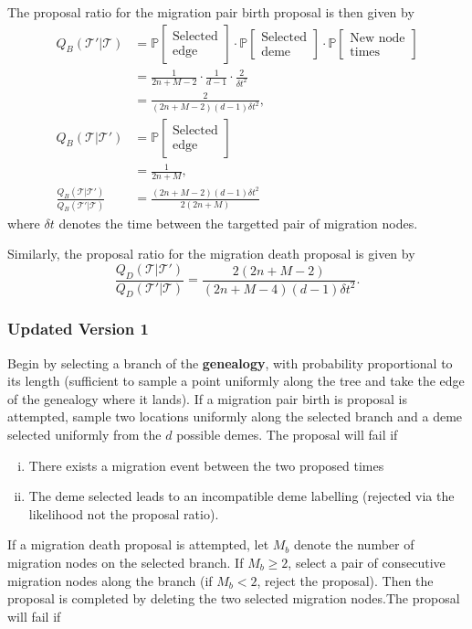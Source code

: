 \documentclass[12pt,a4paper]{article}
\newcommand{\calT}{\mathcal{T}}
\newcommand{\bbP}{\mathbb{P}}
\begin{document}
				The proposal ratio for the migration pair birth proposal is then given by
					\begin{align*}
						Q_B(\calT' | \calT) & = \bbP [\substack{\text{Selected} \\ \text{edge}}] \cdot \bbP [\substack{\text{Selected} \\ \text{deme}}] \cdot \bbP [\substack{\text{New node} \\ \text{times}}] \\
							& = \frac{1}{2n + M - 2} \cdot \frac{1}{d-1} \cdot \frac{2}{\delta t^2} \\
							& = \frac{2}{(2n + M - 2) (d-1) \delta t^2}, \\
						Q_B (\calT | \calT') & = \bbP [ \substack{\text{Selected} \\ \text{edge}}] \\
							& = \frac{1}{2n + M}, \\
						\frac{Q_B (\calT | \calT')}{Q_B (\calT' | \calT)} & = \frac{(2n + M - 2) (d-1) \delta t^2}{2(2n + M)}
					\end{align*}
				where $\delta t$ denotes the time between the targetted pair of migration nodes.
				
				Similarly, the proposal ratio for the migration death proposal is given by
					\[
						\frac{Q_D( \calT | \calT')}{Q_D (\calT' | \calT)} = \frac{2 (2n+M-2)}{(2n + M - 4) (d-1) \delta t^2}.
					\]
					
			\subsubsection{Updated Version 1}
				Begin by selecting a branch of the \textbf{genealogy}, with probability proportional to its length (sufficient to sample a point uniformly along the tree and take the edge of the genealogy where it lands). If a migration pair birth is proposal is attempted, sample two locations uniformly along the selected branch and a deme selected uniformly from the $d$ possible demes. The proposal will fail if
				
					\begin{enumerate}[(i)]
						\item There exists a migration event between the two proposed times
						\item The deme selected leads to an incompatible deme labelling (rejected via the likelihood not the proposal ratio).
					\end{enumerate}
				
				If a migration death proposal is attempted, let $M_b$ denote the number of migration nodes on the selected branch. If $M_b \geq 2$, select a pair of consecutive migration nodes along the branch (if $M_b < 2$, reject the proposal). Then the proposal is completed by deleting the two selected migration nodes.The proposal will fail if
					
\end{document}
